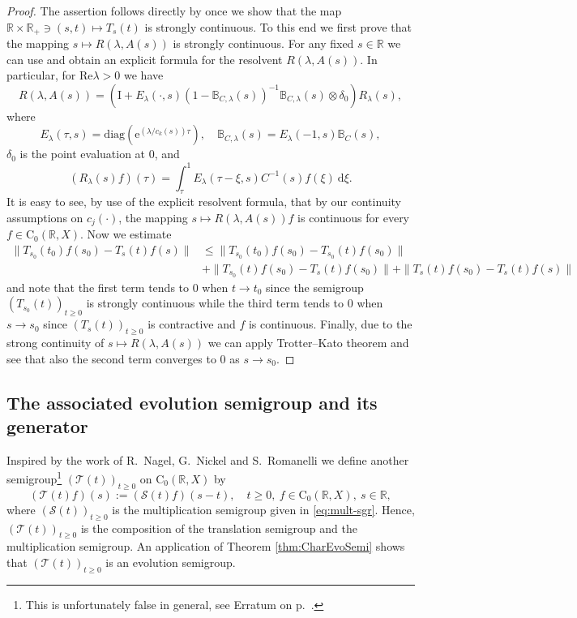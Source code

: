 \documentclass[a4paper,oneside,10pt]{amsart}
\theoremstyle{definition}
\numberwithin{equation}{section}
\def\ee{\mathrm{e}}
\def\dd{\mathrm{d}}
\def\RR{\mathbb{R}}
\def\diag{\mathrm{diag}}
\def\Id{\mathrm{I}}
\begin{document}
\begin{proof}
The assertion follows directly by \cite[Thm.~3.4 \& Lem.~3.5]{G1997} once we show that the map $\RR\times\RR_{+}\ni(s,t)\mapsto T_s(t)$ is strongly continuous. 
To this end we first prove that the mapping $s\mapsto R(\lambda,A(s))$ is strongly continuous. For any fixed $s\in\RR$  we can use  \cite[Prop.~18.12]{BKR2017}  and obtain an explicit formula for the resolvent $R(\lambda,A(s))$. In particular,  for $\mathrm{Re} \lambda >0$  we have
\[
R(\lambda,A(s))=\left(\Id+E_\lambda(\cdot,s)(1-\mathbb{B}_{C,\lambda}(s))^{-1}\mathbb{B}_{C,\lambda}(s)\otimes\delta_0\right)R_{\lambda}(s),
\]
where
\[
E_{\lambda}(\tau,s)=\diag\left(\ee^{(\lambda/c_k(s))\tau}\right),\quad 
\mathbb{B}_{C,\lambda}(s)=E_\lambda(-1,s)\mathbb{B}_C(s),
\]
$\delta_0$ is the point evaluation at $0$, and
\[
(R_\lambda(s)f)(\tau)=\int_{\tau}^1{E_\lambda(\tau-\xi,s)C^{-1}(s)f(\xi)\ \dd\xi}.
\]
It is easy to see, by use of the explicit resolvent formula, that by our continuity assumptions on $c_j(\cdot)$, the mapping $s\mapsto R(\lambda,A(s))f$ is continuous for every $f\in\mathrm{C}_0(\RR,X)$. Now we estimate 
 \begin{align*}
\|T_{s_0}(t_0)f(s_0) - T_s(t)f(s)\| &\le  \|T_{s_0}(t_0)f(s_0) - T_{s_0}(t)f(s_0)\| \\
  &+ \|T_{s_0}(t)f(s_0) - T_s(t)f(s_0)\|+ \|T_{s}(t)f(s_0) - T_s(t)f(s)\|
 \end{align*}
 and note that the first term tends to $0$ when $t\to t_0$ since the semigroup $(T_{s_0}(t))_{t\geq0}$ is strongly continuous while the third  term tends to $0$ when $s\to s_0$ since $(T_{s}(t))_{t\geq0}$ is contractive and $f$ is continuous. Finally, due to the strong continuity of $s\mapsto R(\lambda,A(s))$ we can apply Trotter--Kato theorem  \cite[Thm.~III.4.9]{EN} and see that also the second term converges to $0$ as $s\to s_0$.
\end{proof}



\subsection{The associated evolution semigroup and its generator}

Inspired by the work of R.~Nagel, G.~Nickel and S.~Romanelli \cite[Sect.~4]{NNR1996} we define another semigroup\footnote{This is unfortunately false in general, see Erratum on p.~\pageref{erratum}.} $(\mathcal{T}(t))_{t\geq0}$ on $\mathrm{C}_0(\RR,X)$ by
\begin{equation}\label{eq:sgr-evol}
(\mathcal{T}(t)f)(s):={(\mathcal{S}(t)f)}(s-t),\quad t\geq0,\ f\in\mathrm{C}_0(\RR,X),\ s\in\RR,
\end{equation}
where $(\mathcal{S}(t))_{t\geq0}$ is the multiplication semigroup given in \eqref{eq:mult-sgr}.
Hence, $(\mathcal{T}(t))_{t\geq0}$ is the composition of the translation semigroup and the multiplication semigroup.  An application of Theorem \ref{thm:CharEvoSemi} shows that $(\mathcal{T}(t))_{t\geq0}$ is an evolution semigroup. 
\end{document}
